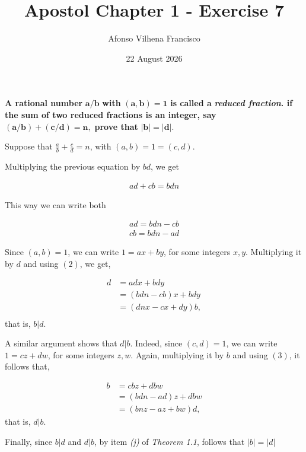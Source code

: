 \documentclass{article}
\title{Apostol Chapter 1 - Exercise 7}
\author{Afonso Vilhena Francisco}
\date{22 August 2026}
\begin{document}
\maketitle

\textbf{A rational number} $\mathbf{a/b}$ \textbf{with} $\mathbf{(a,b)=1}$ \textbf{is called a} \textbf{\textit{reduced fraction}. if the sum of two reduced fractions is an integer, say} $\mathbf{(a/b)+(c/d)=n},$ \textbf{prove that} $\mathbf{|b|=|d|}$.  

\vspace{0.5cm}

Suppose that $\frac{a}{b}+\frac{c}{d}=n$, with $(a,b)=1=(c,d)$.

Multiplying the previous equation by $bd$, we get

\begin{align}
    ad+cb=bdn
\end{align}

This way we can write both

\begin{align}
    ad=bdn-cb\\
    cb=bdn-ad
\end{align}

Since $(a,b)=1$, we can write $1=ax+by$, for some integers $x,y$. Multiplying it by $d$ and using $(2)$, we get,

\begin{align*}
    d &= adx+bdy\\
      &= (bdn-cb)x+bdy\\
      &= (dnx-cx+dy)b,\\
\end{align*}
that is, $b|d$.

A similar argument shows that $d|b$. Indeed, since $(c,d)=1$, we can write $1=cz+dw$, for some integers $z,w$. Again, multiplying it by $b$ and using $(3)$, it follows that,

\begin{align*}
    b &= cbz+dbw\\
      &= (bdn-ad)z+dbw\\
      &= (bnz-az+bw)d,
\end{align*}
that is, $d|b$.

Finally, since $b|d$ and $d|b$, by item \textit{(j)} of \textit{Theorem 1.1}, follows that $|b|=|d|$
\end{document}
